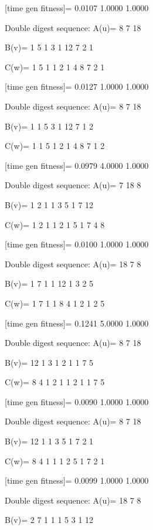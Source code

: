 [time gen fitness]=
    0.0107    1.0000    1.0000

Double digest sequence:
A(u)=
     8     7    18

B(v)=
     1     5     1     3     1    12     7     2     1

C(w)=
     1     5     1     1     2     1     4     8     7     2     1

[time gen fitness]=
    0.0127    1.0000    1.0000

Double digest sequence:
A(u)=
     8     7    18

B(v)=
     1     1     5     3     1    12     7     1     2

C(w)=
     1     1     5     1     2     1     4     8     7     1     2

[time gen fitness]=
    0.0979    4.0000    1.0000

Double digest sequence:
A(u)=
     7    18     8

B(v)=
     1     2     1     1     3     5     1     7    12

C(w)=
     1     2     1     1     2     1     5     1     7     4     8

[time gen fitness]=
    0.0100    1.0000    1.0000

Double digest sequence:
A(u)=
    18     7     8

B(v)=
     1     7     1     1    12     1     3     2     5

C(w)=
     1     7     1     1     8     4     1     2     1     2     5

[time gen fitness]=
    0.1241    5.0000    1.0000

Double digest sequence:
A(u)=
     8     7    18

B(v)=
    12     1     3     1     2     1     1     7     5

C(w)=
     8     4     1     2     1     1     2     1     1     7     5

[time gen fitness]=
    0.0090    1.0000    1.0000

Double digest sequence:
A(u)=
     8     7    18

B(v)=
    12     1     1     3     5     1     7     2     1

C(w)=
     8     4     1     1     1     2     5     1     7     2     1

[time gen fitness]=
    0.0099    1.0000    1.0000

Double digest sequence:
A(u)=
    18     7     8

B(v)=
     2     7     1     1     1     5     3     1    12

